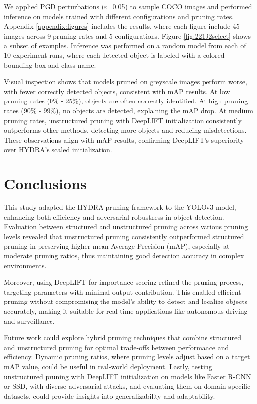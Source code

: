 \documentclass[10pt]{cai}
\begin{document}
We applied PGD perturbations ($\varepsilon$=0.05) to sample COCO images and performed inference on models trained with different configurations and pruning rates. Appendix \ref{appendix:figures} includes the results, where each figure include 45 images across 9 pruning rates and 5 configurations. Figure \ref{fig:22192select} shows a subset of examples. Inference was performed on a random model from each of 10 experiment runs, where each detected object is labeled with a colored bounding box and class name.

Visual inspection shows that models pruned on greyscale images perform worse, with fewer correctly detected objects, consistent with mAP results. At low pruning rates (0\% - 25\%), objects are often correctly identified. At high pruning rates (90\% - 99\%), no objects are detected, explaining the mAP drop. At medium pruning rates, unstructured pruning with DeepLIFT initialization consistently outperforms other methods, detecting more objects and reducing misdetections. These observations align with mAP results, confirming DeepLIFT's superiority over HYDRA's scaled initialization.


\section{Conclusions}
This study adapted the HYDRA pruning framework to the YOLOv3 model, enhancing both efficiency and adversarial robustness in object detection. Evaluation between structured and unstructured pruning across various pruning levels revealed that unstructured pruning consistently outperformed structured pruning in preserving higher mean Average Precision (mAP), especially at moderate pruning ratios, thus maintaining good detection accuracy in complex environments. 

Moreover, using DeepLIFT for importance scoring refined the pruning process, targeting parameters with minimal output contribution. This enabled efficient pruning without compromising the model's ability to detect and localize objects accurately, making it suitable for real-time applications like autonomous driving and surveillance.

Future work could explore hybrid pruning techniques that combine structured and unstructured pruning for optimal trade-offs between performance and efficiency. Dynamic pruning ratios, where pruning levels adjust based on a target mAP value, could be useful in real-world deployment. Lastly, testing unstructured pruning with DeepLIFT initialization on models like Faster R-CNN or SSD, with diverse adversarial attacks, and evaluating them on domain-specific datasets, could provide insights into generalizability and adaptability.
\end{document}
